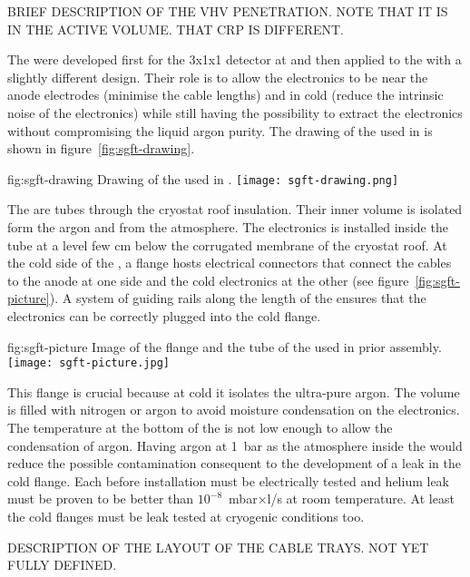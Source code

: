 BRIEF DESCRIPTION OF THE VHV PENETRATION. NOTE THAT IT IS IN THE ACTIVE VOLUME. THAT CRP IS DIFFERENT.

The  were developed first for the 3x1x1 detector at  and then applied to the  with a slightly different design.
Their role is to allow the electronics to be near the anode electrodes (minimise the cable lengths) and in cold (reduce the intrinsic noise of the electronics) while still having the possibility to extract the electronics without compromising the liquid argon purity.
The drawing of the  used in  is shown in figure~\ref{fig:sgft-drawing}.
\begin{dunefigure}{fig:sgft-drawing}
{Drawing of the  used in .}
\texttt{[image: sgft-drawing.png]}
\end{dunefigure}

The  are tubes through the cryostat roof insulation.
Their inner volume is isolated form the argon and from the atmosphere.
The electronics is installed inside the tube at a level few cm below the corrugated membrane of the cryostat roof.
At the cold side of the , a flange hosts electrical connectors that connect the cables to the anode at one side and the cold electronics at the other (see figure~\ref{fig:sgft-picture}).
A system of guiding rails along the length of the  ensures that the electronics can be correctly plugged into the cold flange.
\begin{dunefigure}{fig:sgft-picture}
{Image of the flange and the tube of the  used in  prior assembly.}
\texttt{[image: sgft-picture.jpg]}
\end{dunefigure}
This flange is crucial because at cold it isolates the ultra-pure argon.
The  volume is filled with nitrogen or argon to avoid moisture condensation on the electronics.
The temperature at the bottom of the  is not low enough to allow the condensation of argon.
Having argon at 1~bar as the atmosphere inside the  would reduce the possible  contamination consequent to the development of a leak in the cold flange.
Each  before installation must be electrically tested and helium leak must be proven to be better than $10^{-8}$~mbar$\times$l/s at room temperature.
At least the cold flanges must be leak tested at cryogenic conditions too.

DESCRIPTION OF THE LAYOUT OF THE CABLE TRAYS. NOT YET FULLY DEFINED.

